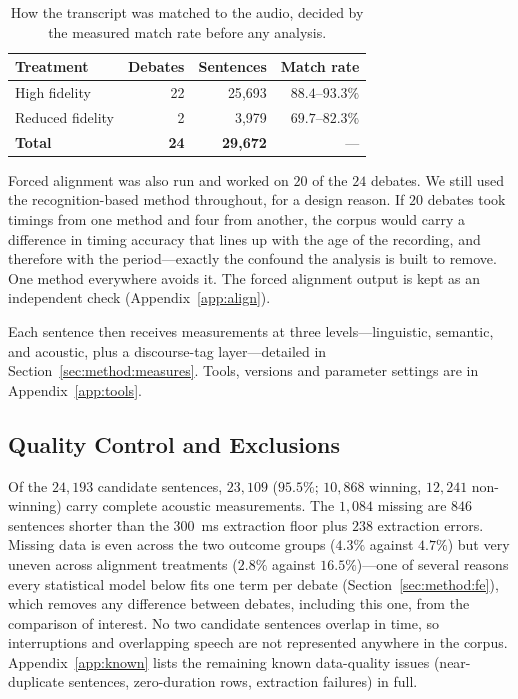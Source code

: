 \documentclass[journal]{IEEEtran}
\begin{document}
\begin{table}[t]
\caption{How the transcript was matched to the audio, decided by the measured
match rate before any analysis.}
\label{tab:align}
\centering
\begin{tabular}{lrrr}
\toprule
Treatment & Debates & Sentences & Match rate \\
\midrule
High fidelity     & 22 & 25{,}693 & $88.4$--$93.3\%$ \\
Reduced fidelity  & 2  & 3{,}979  & $69.7$--$82.3\%$ \\
\midrule
\textbf{Total}    & \textbf{24} & \textbf{29{,}672} & --- \\
\bottomrule
\end{tabular}
\end{table}

Forced alignment was also run and worked on $20$ of the $24$ debates. We still
used the recognition-based method throughout, for a design reason. If $20$
debates took timings from one method and four from another, the corpus would
carry a difference in timing accuracy that lines up with the age of the
recording, and therefore with the period---exactly the confound the analysis
is built to remove. One method everywhere avoids it. The forced alignment
output is kept as an independent check (Appendix~\ref{app:align}).

Each sentence then receives measurements at three levels---linguistic,
semantic, and acoustic, plus a discourse-tag layer---detailed in
Section~\ref{sec:method:measures}. Tools, versions and parameter settings are
in Appendix~\ref{app:tools}.

\subsection{Quality Control and Exclusions}
\label{sec:data:quality}

Of the $24{,}193$ candidate sentences, $23{,}109$ ($95.5\%$; $10{,}868$
winning, $12{,}241$ non-winning) carry complete acoustic measurements. The
$1{,}084$ missing are $846$ sentences shorter than the $300$~ms extraction
floor plus $238$ extraction errors. Missing data is even across the two
outcome groups ($4.3\%$ against $4.7\%$) but very uneven across alignment
treatments ($2.8\%$ against $16.5\%$)---one of several reasons every
statistical model below fits one term per debate (Section~\ref{sec:method:fe}),
which removes any difference between debates, including this one, from the
comparison of interest. No two candidate sentences overlap in time, so
interruptions and overlapping speech are not represented anywhere in the
corpus. Appendix~\ref{app:known} lists the remaining known data-quality
issues (near-duplicate sentences, zero-duration rows, extraction failures) in
full.
\end{document}
